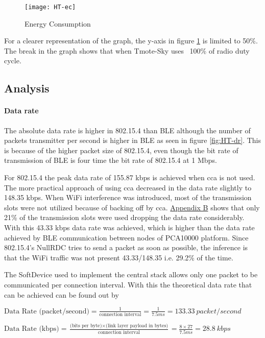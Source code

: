 \begin{figure}[h]
\texttt{[image: HT-ec]}
\caption{Energy Consumption}
\label{fig:HT-ec}
\end{figure}

For a clearer representation of the graph, the y-axis in figure \ref{fig:HT-ec} is limited to 50\%. The break in the graph shows that when Tmote-Sky uses ~100\% of radio duty cycle.

\subsection{Analysis}
\paragraph{Data rate}
The absolute data rate is higher in 802.15.4 than BLE although the number of packets transmitter per second is higher in BLE as seen in figure \ref{fig:HT-dr}. This is because of the higher packet size of 802.15.4, even though the bit rate of transmission of BLE is four time the bit rate of 802.15.4 at 1 Mbps.

For 802.15.4 the peak data rate of 155.87 kbps is achieved when \gls{cca} is not used. The more practical approach of using \gls{cca} decreased in the data rate slightly to 148.35 kbps. When WiFi interference was introduced, most of the transmission slots were not utilized because of backing off by \gls{cca}. \hyperref[AppendixB]{Appendix B} shows that only 21\% of the transmission slots were used dropping the data rate considerably. With this 43.33  kbps data rate was achieved, which is higher than the data rate achieved by BLE communication between nodes of PCA10000 platform. Since 802.15.4's NullRDC tries to send a packet as soon as possible, the inference is that the WiFi traffic was not present 43.33/148.35 i.e. 29.2\% of the time.

The SoftDevice used to implement the central stack allows only one packet to be communicated per connection interval. With this the theoretical data rate that can be achieved can be found out by 

$\mbox{Data Rate  (packet/second)}=\frac{1}{\mbox{connection interval}}=\frac{1}{7.5ms}=133.33\:packet/second$

\vspace{15 pt}
$\mbox{Data Rate (kbps)}=\frac{\mbox{(bits per byte)}\times\mbox{(link layer payload in bytes)}}{\mbox{connection interval}}=\frac{8\times27}{7.5ms}=28.8\:kbps$
\vspace{10 pt}

